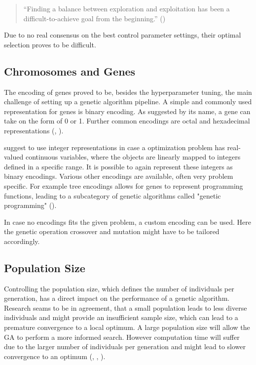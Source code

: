 \begin{quote}
	\begin{em}
		\enquote{Finding a balance between exploration and exploitation has been a difficult-to-achieve goal from the beginning.} (\cite{kacprzyk_parameter_2007})
	\end{em}
\end{quote}

Due to no real consensus on the best control parameter settings, their optimal selection proves to be difficult.

\subsection{Chromosomes and Genes}
\label{sect:foundations:chromosomes_and_genes}


The encoding of genes proved to be, besides the hyperparameter tuning, the main challenge of setting up a genetic algorithm pipeline.
A simple and commonly used representation for genes is binary encoding. As suggested by its name, a gene can take on the form of 0 or 1. Further common encodings are octal and hexadecimal representations (\cite{srinivas_genetic_1994}, \cite{katoch_review_2021}).

\cite{srinivas_genetic_1994} suggest to use integer representations in case a optimization problem has real-valued continuous variables, where the objects are linearly mapped to integers defined in a specific range. It is possible to again represent these integers as binary encodings. Various other encodings are available, often very problem specific. For example tree encodings allows for genes to represent programming functions, leading to a subcategory of genetic algorithms called "genetic programming" (\cite{katoch_review_2021}).

In case no encodings fits the given problem, a custom encoding can be used. Here the genetic operation crossover and mutation might have to be tailored accordingly. 


\subsection{Population Size}
Controlling the population size, which defines the number of individuals per generation, has a direct impact on the performance of a genetic algorithm.
Research seams to be in agreement, that a small population leads to less diverse individuals and might provide an insufficient sample size, which can lead to a premature convergence to a local optimum.
A large population size will allow the GA to perform a more informed search. However computation time will suffer due to the larger number of individuals per generation and might lead to slower convergence to an optimum (\cite{grefenstette_optimization_1986}, \cite{katoch_review_2021}, \cite{kacprzyk_parameter_2007}).

